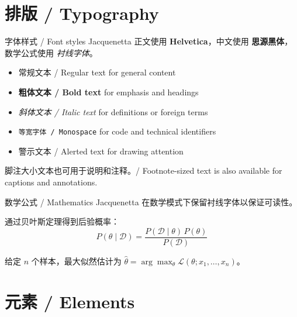 \documentclass[aspectratio=169]{beamer}
\begin{document}
\section{排版 / Typography}


\begin{frame}{字体样式 / Font styles}
    Jacquenetta 正文使用 \textbf{Helvetica}，中文使用 \textbf{思源黑体}，
    数学公式使用 \textit{衬线字体}。

    \vspace{0.4cm}
    \begin{itemize}
        \item 常规文本 / Regular text for general content
        \item \textbf{粗体文本 / Bold text} for emphasis and headings
        \item \textit{斜体文本 / Italic text} for definitions or foreign terms
        \item \texttt{等宽字体 / Monospace} for code and technical identifiers
        \item \alert{警示文本 / Alerted text} for drawing attention
    \end{itemize}

    \vspace{0.4cm}
    {\footnotesize 脚注大小文本也可用于说明和注释。/ Footnote-sized text is also available for captions and annotations.}
\end{frame}

\begin{frame}{数学公式 / Mathematics}
    Jacquenetta 在数学模式下保留衬线字体以保证可读性。

    \vspace{0.2cm}
    通过贝叶斯定理得到后验概率：
    \[
        P(\theta \mid \mathcal{D}) =
        \frac{P(\mathcal{D} \mid \theta)\, P(\theta)}
             {P(\mathcal{D})}
    \]

    给定 $n$ 个样本，最大似然估计为
    $\hat{\theta} = \arg\max_\theta \mathcal{L}(\theta; x_1, \dots, x_n)$。
\end{frame}

\section{元素 / Elements}
\end{document}
